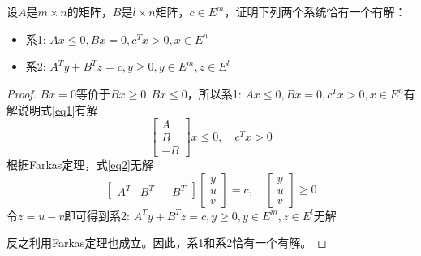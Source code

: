 \documentclass[a4paper]{article}
\begin{document}
\section{}
设$A$是$m\times n$的矩阵，$B$是$l\times n$矩阵，$c\in E^m$，证明下列两个系统恰有一个有解：
\begin{itemize}
	\item 系1: $Ax\le 0,Bx=0, c^Tx>0,x\in E^n$
	\item 系2: $A^Ty+B^Tz=c,y\ge0,y\in E^m,z\in E^l$
\end{itemize}
\begin{proof}
	$Bx=0$等价于$Bx\ge 0,Bx\le 0$，所以系1: $Ax\le 0,Bx=0, c^Tx>0,x\in E^n$有解说明式\ref{eq1}有解
	\begin{equation}
	\label{eq1}
	\left[
	\begin{array}{c}
	A \\
	B \\
	-B
	\end{array}
	\right]
	x \le 0,\quad c^Tx>0
	\end{equation}
	根据Farkas定理，式\ref{eq2}无解
	\begin{equation}
	\label{eq2}
	\left[
	\begin{array}{ccc}
	A^T & B^T & -B^T
	\end{array}
	\right]
	\left[
	\begin{array}{c}
	y \\
	u \\
	v
	\end{array}
	\right]
	=c,\quad
	\left[
	\begin{array}{c}
	y \\
	u \\
	v
	\end{array}
	\right]
	\ge 0
	\end{equation}
	令$z=u-v$即可得到系2: $A^Ty+B^Tz=c,y\ge0,y\in E^m,z\in E^l$无解
	
	反之利用Farkas定理也成立。因此，系1和系2恰有一个有解。
\end{proof}
\end{document}
